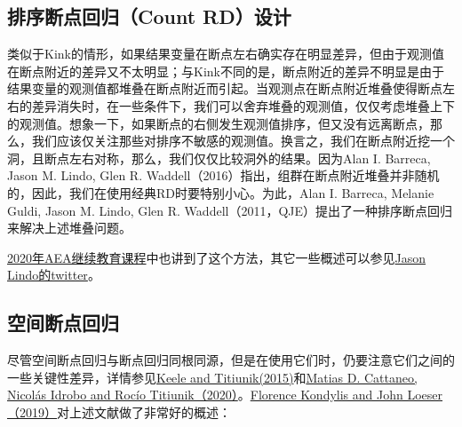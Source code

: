 \documentclass[cn,12pt,math=newtx,citestyle=gb7714-2015,bibstyle=gb7714-2015]{elegantbook}
\begin{document}
	\subsection{排序断点回归（Count RD）设计}
	
	类似于Kink的情形，如果结果变量在断点左右确实存在明显差异，但由于观测值在断点附近的差异又不太明显；与Kink不同的是，断点附近的差异不明显是由于结果变量的观测值都堆叠在断点附近而引起。当观测点在断点附近堆叠使得断点左右的差异消失时，在一些条件下，我们可以舍弃堆叠的观测值，仅仅考虑堆叠上下的观测值。想象一下，如果断点的右侧发生观测值排序，但又没有远离断点，那么，我们应该仅关注那些对排序不敏感的观测值。换言之，我们在断点附近挖一个洞，且断点左右对称，那么，我们仅仅比较洞外的结果。因为Alan I. Barreca, Jason M. Lindo, Glen R. Waddell（2016）指出，组群在断点附近堆叠并非随机的，因此，我们在使用经典RD时要特别小心。为此，Alan I. Barreca, Melanie Guldi, Jason M. Lindo, Glen R. Waddell（2011，QJE）提出了一种排序断点回归来解决上述堆叠问题。
	
   \href{https://www.aeaweb.org/conference/cont-ed/2020-webcasts}{2020年AEA继续教育课程}中也讲到了这个方法，其它一些概述可以参见\href{https://twitter.com/jasonmlindo/status/1240261010319118336?lang=en}{Jason Lindo的twitter}。
	
	
	\subsection{空间断点回归}
	
	
	尽管空间断点回归与断点回归同根同源，但是在使用它们时，仍要注意它们之间的一些关键性差异，详情参见\href{https://www.semanticscholar.org/paper/Geographic-Boundaries-as-Regression-Discontinuities-Keele-Titiunik/5512e7591e86963e89a39984e770b0656fa2b0e2?p2df}{Keele and Titiunik(2015)}和\href{https://www.cambridge.org/core/elements/abs/practical-introduction-to-regression-discontinuity-designs/F04907129D5C1B823E3DB19C31CAB905}{Matias D. Cattaneo, Nicolás Idrobo and Rocío Titiunik（2020）}。\href{https://blogs.worldbank.org/impactevaluations/spatial-jumps}{Florence Kondylis and John Loeser（2019）}对上述文献做了非常好的概述：
	
\end{document}
